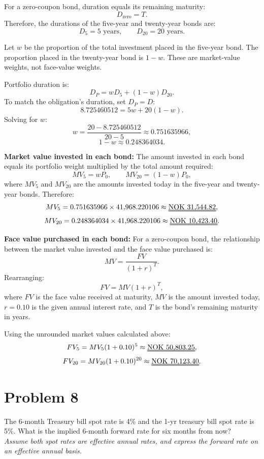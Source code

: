 \documentclass[12]{article}
\begin{document}
\par\noindent For a zero-coupon bond, duration equals its remaining maturity:
\[
D_{\mathrm{zero}}=T.
\]
Therefore, the durations of the five-year and twenty-year bonds are:
\[
D_5=5\text{ years},
\qquad
D_{20}=20\text{ years}.
\]

\par\noindent Let $w$ be the proportion of the total investment placed in the five-year bond. The proportion placed in the twenty-year bond is $1-w$. These are market-value weights, not face-value weights.

\par\noindent Portfolio duration is:
\[
D_P=wD_5+(1-w)D_{20}.
\]
To match the obligation's duration, set $D_P=D$:
\[
8.725460512=5w+20(1-w).
\]
Solving for $w$:
\[
w=\frac{20-8.725460512}{20-5}\approx0.751635966,
\]
\[
1-w\approx0.248364034.
\]

\par\noindent\textbf{Market value invested in each bond:}
The amount invested in each bond equals its portfolio weight multiplied by the total amount required:
\[
MV_5=wP_0,
\qquad
MV_{20}=(1-w)P_0,
\]
where $MV_5$ and $MV_{20}$ are the amounts invested today in the five-year and twenty-year bonds.
Therefore:
\[
MV_5=0.751635966\times41{,}968.220106
\approx\text{\uuline{NOK 31,544.82}},
\]
\[
MV_{20}=0.248364034\times41{,}968.220106
\approx\text{\uuline{NOK 10,423.40}}.
\]

\par\noindent\textbf{Face value purchased in each bond:}
For a zero-coupon bond, the relationship between the market value invested and the face value purchased is:
\[
MV=\frac{FV}{(1+r)^T}.
\]
Rearranging:
\[
FV=MV(1+r)^T,
\]
where $FV$ is the face value received at maturity, $MV$ is the amount invested today, $r=0.10$ is the given annual interest rate, and $T$ is the bond's remaining maturity in years.

\par\noindent Using the unrounded market values calculated above:
\[
FV_5=MV_5(1+0.10)^5
\approx\text{\uuline{NOK 50,803.25}},
\]
\[
FV_{20}=MV_{20}(1+0.10)^{20}
\approx\text{\uuline{NOK 70,123.40}}.
\]




\color{black}
\section*{Problem 8}
The 6-month Treasury bill spot rate is 4\% and the 1-yr treasury bill spot rate is 5\%. What is the implied 6-month forward rate for six months from now?\\
\textit{Assume both spot rates are effective annual rates, and express the forward rate on an effective annual basis.}
\end{document}
